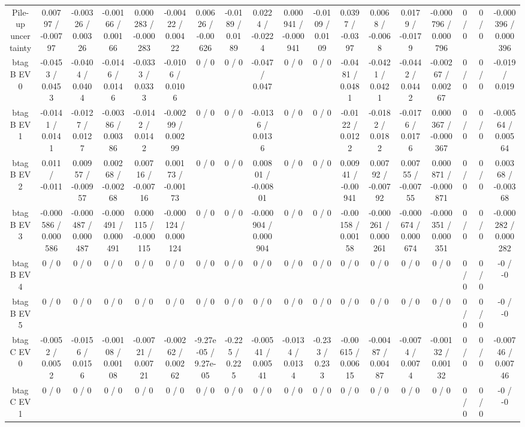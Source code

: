 \documentclass[10pt]{article}
\begin{document}
\begin{table}[htbp]
\begin{center}
\begin{tabular}{|c|c|c|c|c|c|c|c|c|c|c|c|c|c|c|c|c|c|}
  Pile-up uncertainty & 0.00797 / -0.00797 & -0.00326 / 0.00326 & -0.00166 / 0.00166 & 0.000283 / -0.000283 & -0.00422 / 0.00422 & 0.00626 / -0.00626 & -0.0189 / 0.0189 & 0.0224 / -0.0224 & 0.000941 / -0.000941 & -0.0109 / 0.0109 & 0.0397 / -0.0397 & 0.0068 / -0.0068 & 0.0179 / -0.0179 & -0.000796 / 0.000796 & 0 / 0 & 0 / 0 & -0.000396 / 0.000396 \\ 
  btag B EV 0 & -0.0453 / 0.0453 & -0.0404 / 0.0404 & -0.0146 / 0.0146 & -0.0333 / 0.0333 & -0.0106 / 0.0106 & 0 / 0 & 0 / 0 & -0.047 / 0.047 & 0 / 0 & 0 / 0 & -0.0481 / 0.0481 & -0.0421 / 0.0421 & -0.0442 / 0.0442 & -0.00267 / 0.00267 & 0 / 0 & 0 / 0 & -0.019 / 0.019 \\ 
  btag B EV 1 & -0.0141 / 0.0141 & -0.0127 / 0.0127 & -0.00386 / 0.00386 & -0.0142 / 0.0142 & -0.00299 / 0.00299 & 0 / 0 & 0 / 0 & -0.0136 / 0.0136 & 0 / 0 & 0 / 0 & -0.0122 / 0.0122 & -0.0182 / 0.0182 & -0.0176 / 0.0176 & 0.000367 / -0.000367 & 0 / 0 & 0 / 0 & -0.00564 / 0.00564 \\ 
  btag B EV 2 & 0.011 / -0.011 & 0.00957 / -0.00957 & 0.00268 / -0.00268 & 0.00716 / -0.00716 & 0.00173 / -0.00173 & 0 / 0 & 0 / 0 & 0.00801 / -0.00801 & 0 / 0 & 0 / 0 & 0.00941 / -0.00941 & 0.00792 / -0.00792 & 0.00755 / -0.00755 & 0.000871 / -0.000871 & 0 / 0 & 0 / 0 & 0.00368 / -0.00368 \\ 
  btag B EV 3 & -0.000586 / 0.000586 & -0.000487 / 0.000487 & -0.000491 / 0.000491 & 0.000115 / -0.000115 & -0.000124 / 0.000124 & 0 / 0 & 0 / 0 & -0.000904 / 0.000904 & 0 / 0 & 0 / 0 & -0.00158 / 0.00158 & -0.000261 / 0.000261 & -0.000674 / 0.000674 & -0.000351 / 0.000351 & 0 / 0 & 0 / 0 & -0.000282 / 0.000282 \\ 
  btag B EV 4 & 0 / 0 & 0 / 0 & 0 / 0 & 0 / 0 & 0 / 0 & 0 / 0 & 0 / 0 & 0 / 0 & 0 / 0 & 0 / 0 & 0 / 0 & 0 / 0 & 0 / 0 & 0 / 0 & 0 / 0 & 0 / 0 & -0 / -0 \\ 
  btag B EV 5 & 0 / 0 & 0 / 0 & 0 / 0 & 0 / 0 & 0 / 0 & 0 / 0 & 0 / 0 & 0 / 0 & 0 / 0 & 0 / 0 & 0 / 0 & 0 / 0 & 0 / 0 & 0 / 0 & 0 / 0 & 0 / 0 & -0 / -0 \\ 
  btag C EV 0 & -0.0052 / 0.0052 & -0.0156 / 0.0156 & -0.00108 / 0.00108 & -0.00721 / 0.00721 & -0.00262 / 0.00262 & -9.27e-05 / 9.27e-05 & -0.225 / 0.225 & -0.00541 / 0.00541 & -0.0134 / 0.0134 & -0.233 / 0.233 & -0.00615 / 0.00615 & -0.00487 / 0.00487 & -0.0074 / 0.0074 & -0.00132 / 0.00132 & 0 / 0 & 0 / 0 & -0.00746 / 0.00746 \\ 
  btag C EV 1 & 0 / 0 & 0 / 0 & 0 / 0 & 0 / 0 & 0 / 0 & 0 / 0 & 0 / 0 & 0 / 0 & 0 / 0 & 0 / 0 & 0 / 0 & 0 / 0 & 0 / 0 & 0 / 0 & 0 / 0 & 0 / 0 & -0 / -0 \\ 

\end{tabular}
\end{center}
\end{table}
\end{document}
